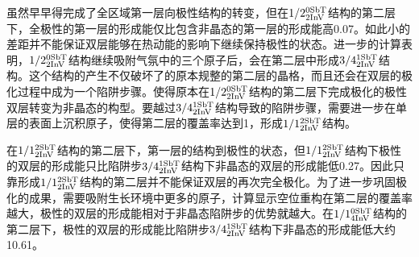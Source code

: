 虽然早早得完成了全区域第一层向极性结构的转变，但在$\rm 1/2{}_{2InV}^{0SbT} \it$结构的第二层下，全极性的第一层的形成能仅比包含非晶态的第一层的形成能高\SI{0.07}{\mievpas}。如此小的差距并不能保证双层能够在热动能的影响下继续保持极性的状态。进一步的计算表明，$\rm 1/2{}_{2InV}^{0SbT} \it$结构继续吸附气氛中的三个原子后，会在第二层中形成$\rm 3/4{}_{2InV}^{1SbT} \it$结构。这个结构的产生不仅破坏了的原本规整的第二层的晶格，而且还会在双层的极化过程中成为一个陷阱步骤。使得原本在$\rm 1/2{}_{2InV}^{0SbT} \it$结构的第二层下完成极化的极性双层转变为非晶态的构型。要越过$\rm 3/4{}_{2InV}^{1SbT} \it$结构导致的陷阱步骤，需要进一步在单层的表面上沉积原子，使得第二层的覆盖率达到1，形成$\rm 1/1{}_{2InV}^{2SbT} \it$结构。

在$\rm 1/1{}_{2InV}^{2SbT} \it$结构的第二层下，第一层的结构到极性的状态，但$\rm 1/1{}_{2InV}^{2SbT} \it$结构下极性的双层的形成能只比陷阱步$\rm 3/4{}_{2InV}^{1SbT} \it$结构下非晶态的双层的形成能低\SI{0.27}{\mievpas}。因此只靠形成$\rm 1/1{}_{2InV}^{2SbT} \it$结构的第二层并不能保证双层的再次完全极化。为了进一步巩固极化的成果，需要吸附生长环境中更多的原子，计算显示空位重构在第二层的覆盖率越大，极性的双层的形成能相对于非晶态陷阱步的优势就越大。在$\rm 1/1{}_{4InV}^{0SbT} \it$结构的第二层下，极性的双层的形成能比陷阱步$\rm 3/4{}_{2InV}^{1SbT} \it$结构下非晶态的形成能低大约\SI{10.61}{\mievpas}。

